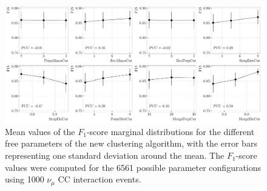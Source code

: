 \begin{figure}[t]
	\centering
	\includegraphics[width=.99\linewidth]{Images/GArSoft_PID/Neutral/coolcluster_optimisation_F1S.pdf}
	\caption{Mean values of the $F_{1}$-score marginal distributions for the different free parameters of the new clustering algorithm, with the error bars representing one standard deviation around the mean. The $F_{1}$-score values were computed for the 6561 possible parameter configurations using 1000 $\nu_{\mu}$ CC interaction events.}
	\label{fig:clustering_optimisation}
\end{figure}

